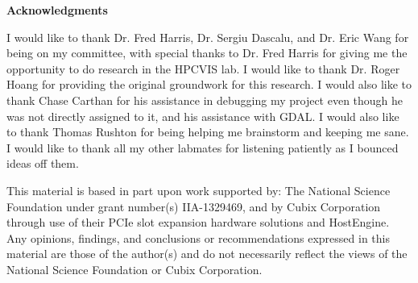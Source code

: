 \newpage
{}
\begin{center}
  \bf {Acknowledgments}
\end{center}

I would like to thank Dr. Fred Harris, Dr. Sergiu Dascalu, and Dr. Eric Wang for being on my committee, with special thanks to Dr. Fred Harris for giving me the opportunity to do research in the HPCVIS lab. I would like to thank Dr. Roger Hoang for providing the original groundwork for this research. I would also like to thank Chase Carthan for his assistance in debugging my project even though he was not directly assigned to it, and his assistance with GDAL. I would also like to thank Thomas Rushton for being helping me brainstorm and keeping me sane. I would like to thank all my other labmates for listening patiently as I bounced ideas off them. 

This material is based in part upon work supported by: The National Science Foundation under grant number(s) IIA-1329469, and by Cubix Corporation through use of their PCIe slot expansion hardware solutions and HostEngine. Any opinions, findings, and conclusions or recommendations expressed in this material are those of the author(s) and do not necessarily reflect the views of the National Science Foundation or Cubix Corporation.